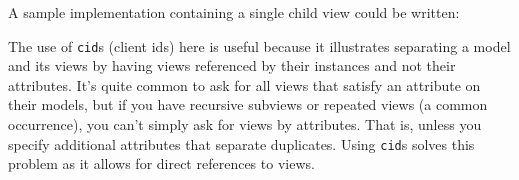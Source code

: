 \documentclass[9pt]{book}
\newenvironment{Shaded}{}{}
\newcommand{\KeywordTok}[1]{\textcolor[rgb]{0.00,0.44,0.13}{\textbf{{#1}}}}
\newcommand{\DataTypeTok}[1]{\textcolor[rgb]{0.56,0.13,0.00}{{#1}}}
\newcommand{\StringTok}[1]{\textcolor[rgb]{0.25,0.44,0.63}{{#1}}}
\newcommand{\OtherTok}[1]{\textcolor[rgb]{0.00,0.44,0.13}{{#1}}}
\newcommand{\FunctionTok}[1]{\textcolor[rgb]{0.02,0.16,0.49}{{#1}}}
\newcommand{\NormalTok}[1]{{#1}}
\begin{document}
A sample implementation containing a single child view could be written:

\begin{Shaded}
\end{Shaded}

The use of \texttt{cid}s (client ids) here is useful because it
illustrates separating a model and its views by having views referenced
by their instances and not their attributes. It's quite common to ask
for all views that satisfy an attribute on their models, but if you have
recursive subviews or repeated views (a common occurrence), you can't
simply ask for views by attributes. That is, unless you specify
additional attributes that separate duplicates. Using \texttt{cid}s
solves this problem as it allows for direct references to views.
\end{document}
